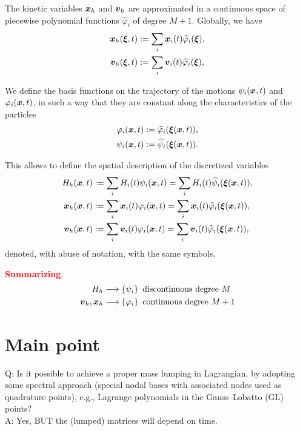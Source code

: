 \documentclass[english]{article}
\theoremstyle{thmstyleone}
\theoremstyle{thmstyletwo}
\theoremstyle{thmstylethree}
\newcommand{\uvec}[2][3]{\boldsymbol{#2\mkern-#1mu}\mkern#1mu}
\newcommand{\hpsi}{\widehat{\psi}}
\newcommand{\hphi}{\widehat{\varphi}}
\begin{document}
The kinetic variables $\uvec{x}_h$ and $\uvec{v}_h$ are approximated in a continuous space of piecewise polynomial functions $\hphi_i$ of degree $M+1$. Globally, we have
\begin{align}
\uvec{x}_h(\uvec{\xi},t)&:=\sum_{i}\uvec{x}_i(t)\hphi_i(\uvec{\xi}),\\
\uvec{v}_h(\uvec{\xi},t)&:=\sum_{i}\uvec{v}_i(t)\hphi_i(\uvec{\xi}),
\end{align}


We define the basis functions on the trajectory of the motions $\psi_i(\uvec{x},t)$ and $\varphi_i(\uvec{x},t)$, in such a way that they are constant along the characteristics of the particles
\begin{align}
\varphi_i(\uvec{x},t)&:=\hphi_i(\uvec{\xi}(\uvec{x},t)),\\
\psi_i(\uvec{x},t)&:=\hpsi_i(\uvec{\xi}(\uvec{x},t)).
\end{align}

This allows to define the spatial description of the discretized variables
\begin{align*}
H_h(\uvec{x},t)&:=\sum_{i}H_i(t)\psi_i(\uvec{x},t)=\sum_{i}H_i(t)\hpsi_i(\uvec{\xi}(\uvec{x},t)),\\
\uvec{x}_h(\uvec{x},t)&:=\sum_{i}\uvec{x}_i(t)\varphi_i(\uvec{x},t)=\sum_{i}\uvec{x}_i(t)\hphi_i(\uvec{\xi}(\uvec{x},t)),\\
\uvec{v}_h(\uvec{x},t)&:=\sum_{i}\uvec{v}_i(t)\varphi_i(\uvec{x},t)=\sum_{i}\uvec{v}_i(t)\hphi_i(\uvec{\xi}(\uvec{x},t)),
\end{align*}
denoted, with abuse of notation, with the same symbols.

\textcolor{red}{\textbf{Summarizing},
\begin{align}
	H_h &\longrightarrow \left\lbrace \psi_i \right\rbrace~\text{discontinuous degree}~M \\
	\uvec{v}_h,\uvec{x}_h &\longrightarrow \left\lbrace \varphi_i \right\rbrace~\text{continuous degree}~M+1
\end{align}		
}

\section{Main point}\label{sec:main_point}
Q: Is it possible to achieve a proper mass lumping in Lagrangian, by adopting some spectral approach (special nodal bases with associated nodes used as quadrature points), e.g., Lagrange polynomials in the Gauss--Lobatto (GL) points?\\
A: Yes, BUT the (lumped) matrices will depend on time.
\end{document}
